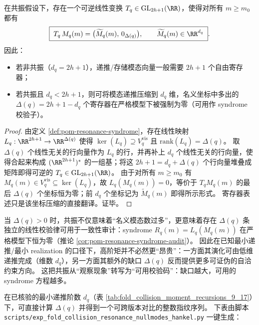 \begin{corollary}\label{cor:pom-resonance-register-savings}
在共振假设下，存在一个可逆线性变换 \(T_q\in\mathrm{GL}_{2h+1}(\RR)\)，使得对所有 \(m\ge m_0\) 都有
\[
\boxed{\;
T_q\,M_q(m)=\bigl(\widetilde M_q(m),\,0_{\Delta(q)}\bigr),\qquad
\widetilde M_q(m)\in\RR^{d_q}\; }.
\]
因此：
\begin{itemize}
  \item 若非共振（\(d_q=2h+1\)），递推/存储模态向量一般需要 \(2h+1\) 个自由寄存器；
  \item 若共振且 \(d_q<2h+1\)，则可将模态递推压缩到 \(d_q\) 维，名义坐标中多出的 \(\Delta(q)=2h+1-d_q\) 个寄存器在严格模型下被强制为零（可用作 syndrome 校验子）。
\end{itemize}
\end{corollary}
\begin{proof}
由定义 \ref{def:pom-resonance-syndrome}，存在线性映射 \(L_q:\RR^{2h+1}\to\RR^{\Delta(q)}\) 使得 \(\ker(L_q)\supseteq V_q^{\mathrm{vis}}\) 且 \(\mathrm{rank}(L_q)=\Delta(q)\)。
取 \(\Delta(q)\) 个线性无关的行向量作为 \(L_q\) 的行，并再补上 \(d_q\) 个线性无关的行向量，使得合起来构成 \((\RR^{2h+1})^\ast\) 的一组基；将这 \(2h+1=d_q+\Delta(q)\) 个行向量堆叠成矩阵即得可逆的 \(T_q\in\mathrm{GL}_{2h+1}(\RR)\)。
由于对所有 \(m\ge m_0\) 有 \(M_q(m)\in V_q^{\mathrm{vis}}\subseteq\ker(L_q)\)，故
\(
L_q(M_q(m))=0
\)，等价于 \(T_q M_q(m)\) 的最后 \(\Delta(q)\) 个坐标恒为零；前 \(d_q\) 个坐标记为 \(\widetilde M_q(m)\) 即得所示形式。
寄存器表述只是该坐标压缩的直接翻译。证毕。
\end{proof}

\begin{remark}\label{rem:pom-resonance-as-resource}
当 \(\Delta(q)>0\) 时，共振不仅意味着“名义模态数过多”，更意味着存在 \(\Delta(q)\) 条独立的线性校验律可用于一致性审计：syndrome \(R_q(m)=L_q(M_q(m))\) 在严格模型下恒为零（推论 \ref{cor:pom-resonance-syndrome-audit}）。
因此在已知最小递推/最小 realization 的口径下，高阶矩并不必然更“昂贵”：一方面其演化可由低维递推完成（维数 \(d_q\)），另一方面其额外的缺口 \(\Delta(q)\) 反而提供更多可证伪的自洽约束方向。
这把共振从“观察现象”转写为“可用校验码”：缺口越大，可用的 syndrome 方程越多。
\end{remark}

\begin{remark}[已核验窗口内的 \texorpdfstring{$\Delta(q)$}{Delta(q)} 读数（\(q=9,\dots,17\)）]\label{rem:pom-delta-q9-17}
在已核验的最小递推阶数 \(d_q\)（表 \ref{tab:fold_collision_moment_recursions_9_17}）下，可直接计算 \(\Delta(q)\) 并得到一个可跨版本对比的整数指纹序列。
下表由脚本 \texttt{scripts/exp\_fold\_collision\_resonance\_nullmodes\_hankel.py} 一键生成：
\end{remark}

